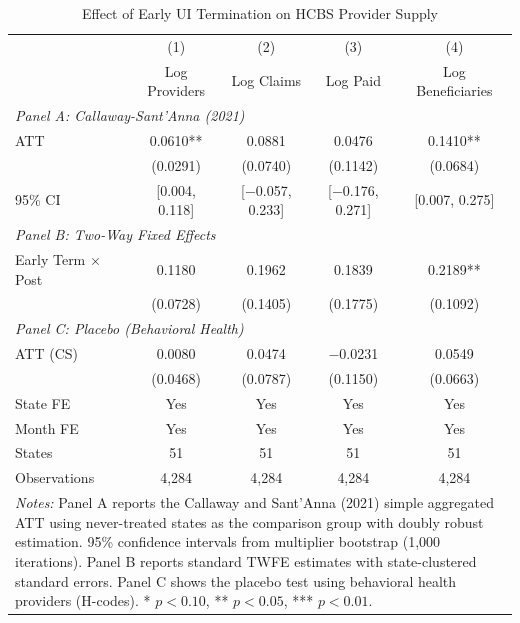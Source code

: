 \begin{table}[htbp]
\centering
\caption{Effect of Early UI Termination on HCBS Provider Supply}
\label{tab:main_results}
\begin{tabular}{lcccc}
\hline\hline
 & (1) & (2) & (3) & (4) \\
 & Log Providers & Log Claims & Log Paid & Log Beneficiaries \\
\hline
\multicolumn{5}{l}{\textit{Panel A: Callaway-Sant'Anna (2021)}} \\
ATT & 0.0610** & 0.0881 & 0.0476 & 0.1410** \\
 & (0.0291) & (0.0740) & (0.1142) & (0.0684) \\
95\% CI & [0.004, 0.118] & [$-$0.057, 0.233] & [$-$0.176, 0.271] & [0.007, 0.275] \\
[6pt]
\multicolumn{5}{l}{\textit{Panel B: Two-Way Fixed Effects}} \\
Early Term $\times$ Post & 0.1180 & 0.1962 & 0.1839 & 0.2189** \\
 & (0.0728) & (0.1405) & (0.1775) & (0.1092) \\
[6pt]
\multicolumn{5}{l}{\textit{Panel C: Placebo (Behavioral Health)}} \\
ATT (CS) & 0.0080 & 0.0474 & $-$0.0231 & 0.0549 \\
 & (0.0468) & (0.0787) & (0.1150) & (0.0663) \\
\hline
State FE & Yes & Yes & Yes & Yes \\
Month FE & Yes & Yes & Yes & Yes \\
States & 51 & 51 & 51 & 51 \\
Observations & 4,284 & 4,284 & 4,284 & 4,284 \\
\hline\hline
\multicolumn{5}{p{13cm}}{\footnotesize \textit{Notes:} Panel A reports the Callaway and Sant'Anna (2021) simple aggregated ATT using never-treated states as the comparison group with doubly robust estimation. 95\% confidence intervals from multiplier bootstrap (1,000 iterations). Panel B reports standard TWFE estimates with state-clustered standard errors. Panel C shows the placebo test using behavioral health providers (H-codes). * $p<0.10$, ** $p<0.05$, *** $p<0.01$.} \\
\end{tabular}
\end{table}
